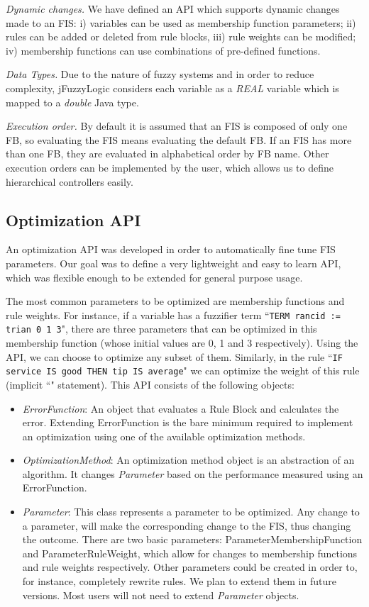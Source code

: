 \documentclass[11pt,twoside]{article}
\begin{document}
\begin{multicols}{2}
\textit{Dynamic changes.} We have defined an API which supports dynamic changes made to an FIS: i) variables can be used as membership function parameters; ii) rules can be added or deleted from rule blocks, iii) rule weights can be modified; iv) membership functions can use combinations of pre-defined functions. 

\textit{Data Types.} Due to the nature of fuzzy systems and in order to reduce complexity, jFuzzyLogic considers each variable as a \textit{REAL} variable which is mapped to a \textit{double} Java type.

\textit{Execution order.} By default it is assumed that an FIS is composed of only one FB, so evaluating the FIS means evaluating the default FB.  If an FIS has more than one FB, they are evaluated in alphabetical order by FB name. Other execution orders can be implemented by the user, which allows us to define hierarchical controllers easily.


\subsection{Optimization API \label{sec:optim}}


An optimization API was developed in order to automatically fine tune FIS parameters. Our goal was to define a very lightweight and easy to learn API, which was flexible enough to be extended for general purpose usage.

The most common parameters to be optimized are membership functions and rule weights. For instance, if a variable has a fuzzifier term ``\texttt{TERM rancid := trian 0 1 3}", there are three parameters that can be optimized in this membership function (whose initial values are 0, 1 and 3 respectively).  Using the API, we can choose to optimize any subset of them. Similarly, in the rule ``\texttt{IF service IS good THEN tip IS average}" we can optimize the weight of this rule (implicit ``" statement). This API consists of the following objects:
\begin{itemize}
	\item \textit{ErrorFunction}: An object that evaluates a Rule Block and calculates the error. Extending ErrorFunction is the bare minimum required to implement an optimization using one of the available optimization methods.
	\item \textit{OptimizationMethod}: An optimization method object is an abstraction of an algorithm. It changes \textit{Parameter} based on the performance measured using an ErrorFunction.
	\item \textit{Parameter}: This class represents a parameter to be optimized. Any change to a parameter, will make the corresponding change to the FIS, thus changing the outcome. There are two basic parameters: ParameterMembershipFunction and ParameterRuleWeight, which allow for changes to membership functions and rule weights respectively. Other parameters could be created in order to, for instance, completely rewrite rules. We plan to extend them in future versions. Most users will not need to extend \textit{Parameter} objects.
\end{itemize}


\end{multicols}
\end{document}

